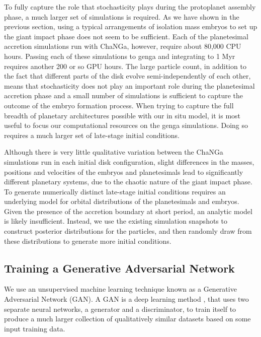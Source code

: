 To fully capture the role that stochasticity plays during the protoplanet assembly phase, a much larger set of simulations is required. As we have shown in the previous section, using a typical arrangements of isolation mass embryos to set up the giant impact phase does not seem to be sufficient. Each of the planetesimal accretion simulations run with {\sc ChaNGa}, however, require about 80,000 CPU hours. Passing each of these simulations to {\sc genga} and integrating to 1 Myr requires another 200 or so GPU hours. The large particle count, in addition to the fact that different parts of the disk evolve semi-independently of each other, means that stochasticity does not play an important role during the planetesimal accretion phase and a small number of simulations is sufficient to capture the outcome of the embryo formation process. When trying to capture the full breadth of planetary architectures possible with our in situ model, it is most useful to focus our computational resources on the {\sc genga} simulations. Doing so requires a much larger set of late-stage initial conditions.

Although there is very little qualitative variation between the {\sc ChaNGa} simulations run in each initial disk configuration, slight differences in the masses, positions and velocities of the embryos and planetesimals lead to significantly different planetary systems, due to the chaotic nature of the giant impact phase. To generate numerically distinct late-stage initial conditions requires an underlying model for orbital distributions of the planetesimals and embryos. Given the presence of the accretion boundary at short period, an analytic model is likely insufficient. Instead, we use the existing simulation snapshots to construct posterior distributions for the particles, and then randomly draw from these distributions to generate more initial conditions.

\subsection{Training a Generative Adversarial Network}

We use an unsupervised machine learning technique known as a Generative Adversarial Network (GAN). A GAN is a deep learning method \cite{goodfellow14}, that uses two separate neural networks, a generator and a discriminator, to train itself to produce a much larger collection of qualitatively similar datasets based on some input training data.


